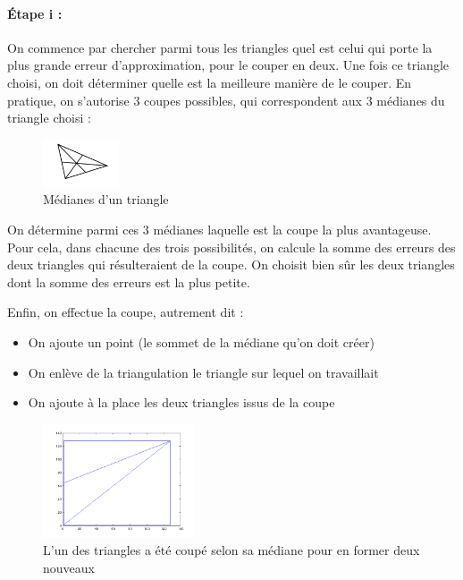 \documentclass{report}
\begin{document}
\paragraph{Étape i :}

On commence par chercher parmi tous les triangles quel est celui qui porte la plus grande erreur d'approximation, pour le couper en deux. Une fois ce triangle choisi, on doit déterminer quelle est la meilleure manière de le couper. En pratique, on s'autorise 3 coupes possibles, qui correspondent aux 3 médianes du triangle choisi :

\begin{figure}[ht]
\centering
\includegraphics[width=0.2\textwidth]{triangle.png}
\caption{Médianes d'un triangle}
\end{figure}

On détermine parmi ces 3 médianes laquelle est la coupe la plus avantageuse. Pour cela, dans chacune des trois possibilités, on calcule la somme des erreurs des deux triangles qui résulteraient de la coupe. On choisit bien sûr les deux triangles dont la somme des erreurs est la plus petite.

Enfin, on effectue la coupe, autrement dit :
\begin{itemize}
	\item On ajoute un point (le sommet de la médiane qu'on doit créer)
	\item On enlève de la triangulation le triangle sur lequel on travaillait
	\item On ajoute à la place les deux triangles issus de la coupe
\end{itemize}


\begin{figure}[ht]
\centering
\includegraphics[width=0.4\textwidth]{beginBissect2.png}
\caption{L'un des triangles a été coupé selon sa médiane pour en former deux nouveaux}
\end{figure}
\end{document}
